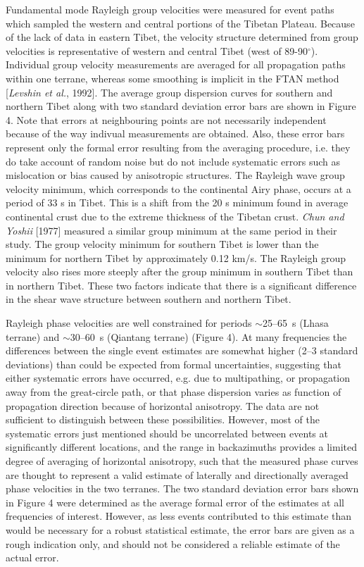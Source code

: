 \documentclass[12pt]{article}
\begin{document}
Fundamental mode Rayleigh group velocities were measured for event paths which sampled the western and 
central portions of the Tibetan Plateau. Because of the lack of data in eastern Tibet, the velocity 
structure determined from group velocities is representative of western and central Tibet (west of 
89-90$^\circ$).  Individual group velocity measurements are averaged for all propagation 
paths within one terrane, whereas some smoothing is implicit in
the FTAN method [{\it Levshin et al.}, 1992].   The average group dispersion curves for southern and northern Tibet along with 
two standard deviation error bars are shown in Figure 4.  Note that
errors at
neighbouring points are not necessarily independent because of the way
indivual measurements are obtained. Also, these error bars represent only the formal error resulting from the averaging procedure, i.e. they do take account of random noise but do not include systematic errors such as mislocation or bias caused by anisotropic structures.  The Rayleigh wave group velocity minimum, which 
corresponds to the continental Airy phase, occurs at a period of 33 s in Tibet.  This is a shift from the 
20 s minimum found in average continental crust due to the extreme thickness of the Tibetan crust.  {\it 
Chun and Yoshii} [1977] measured a similar group minimum at the same period in their study. The group 
velocity minimum for southern Tibet is lower than the minimum for northern Tibet by approximately 0.12 
km/s.  The Rayleigh group velocity also rises more steeply after the group minimum in southern Tibet than 
in northern Tibet.  These two factors indicate that there is a significant difference in the shear wave 
structure between southern and northern Tibet. 

Rayleigh phase velocities are well constrained for periods $\sim$25--65~s (Lhasa terrane) and 
$\sim$30--60~s (Qiantang terrane) (Figure 4).  At many frequencies the differences between the single event 
estimates are somewhat higher (2--3 standard deviations) than could be expected from formal uncertainties, suggesting that either 
systematic errors have occurred, e.g. due to multipathing, or propagation away from the great-circle path, 
or that phase dispersion varies as function of propagation direction because of horizontal anisotropy. The 
data are not sufficient to distinguish between these possibilities.  However, most of the systematic errors 
just mentioned should be uncorrelated between events at significantly different locations, and the range in 
backazimuths provides a limited degree of averaging of horizontal anisotropy, such that the measured phase 
curves are thought to represent a valid estimate of laterally and directionally averaged phase velocities 
in the two terranes.  The two standard deviation error bars shown 
in Figure 4 were determined as the average formal error of the estimates at all frequencies of interest.  However, as less events contributed to this estimate than would be necessary for a robust statistical estimate, the error bars are given as a rough indication only, and should not be considered a reliable estimate of the actual error.
\end{document}

